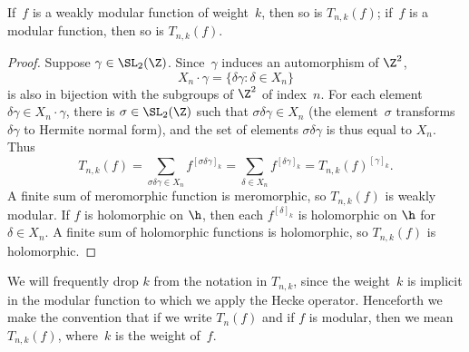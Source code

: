 \begin{proposition}\label{prop:tn_presweak}
  If~$f$ is a weakly modular function of weight~$k$, then so is
  $T_{n,k}(f)$; if~$f$ is a modular function, then so is $T_{n,k}(f)$.
\end{proposition}
\begin{proof}
Suppose $\gamma\in\SL_2(\Z)$.  Since~$\gamma$ 
induces an automorphism of $\Z^2$,
$$X_n \cdot \gamma = \{ \delta \gamma : \delta\in X_n\}$$
is also in bijection with the subgroups
of $\Z^2$ of index~$n$.  
For each element $\delta\gamma \in X_n\cdot \gamma$, there
is $\sigma\in\SL_2(\Z)$ such that $\sigma\delta\gamma\in X_n$ (the
element~$\sigma$ 
transforms $\delta\gamma$ to Hermite normal form),
and the set of elements $\sigma\delta\gamma$ is thus equal to $X_n$.
Thus 
$$
 T_{n,k}(f) = \sum_{\sigma\delta\gamma\in X_n} f^{[\sigma\delta\gamma]_k} 
     = \sum_{\delta\in X_n} f^{[\delta\gamma]_k}
     = T_{n,k}(f)^{[\gamma]_k}.
$$
A finite sum of meromorphic function is
meromorphic, so $T_{n,k}(f)$ is weakly modular. 
If $f$ is holomorphic on $\h$, then
each $f^{[\delta]_k}$ is holomorphic on $\h$ for $\delta \in X_n$.
A finite sum of holomorphic functions is holomorphic,
so $T_{n,k}(f)$ is holomorphic.

\end{proof}

We will frequently drop $k$ from the notation in $T_{n,k}$, since
the weight~$k$ is implicit in the modular function to which
we apply the Hecke operator.  Henceforth we make the
convention that if we write $T_{n}(f)$ and if $f$ is modular, 
then we mean $T_{n,k}(f)$, where~$k$ is the weight of~$f$.

